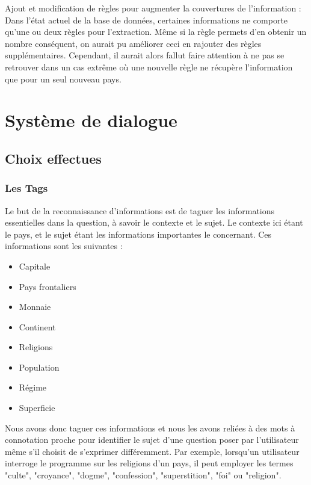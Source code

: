 \documentclass[11pt,a4paper]{article}
\begin{document}
	
Ajout et modification de règles pour augmenter la couvertures de l'information :
Dans l'état actuel de la base de données, certaines informations ne comporte qu'une ou deux règles pour l'extraction.
Même si la règle permets d'en obtenir un nombre conséquent, on aurait pu améliorer ceci en rajouter des règles supplémentaires.
Cependant, il aurait alors fallut faire attention à ne pas se retrouver dans un cas extrême où une nouvelle règle ne récupère l'information que pour un seul nouveau pays.

\clearpage

\section{Système de dialogue}

\subsection{Choix effectues}

\subsubsection{Les Tags} 

Le but de la reconnaissance d’informations est de taguer les informations essentielles dans la question, à savoir le contexte et le sujet. Le contexte ici étant le pays, et le sujet étant les informations importantes le concernant. Ces informations sont les suivantes :
\begin{itemize}
	\item Capitale
	\item Pays frontaliers
	\item Monnaie
	\item Continent
	\item Religions
	\item Population
	\item Régime
	\item Superficie
\end{itemize}

Nous avons donc taguer ces informations et nous les avons reliées à des mots à connotation proche pour identifier le sujet d'une question poser par l'utilisateur même s'il choisit de s'exprimer différemment. Par exemple, lorsqu'un utilisateur interroge le programme sur les religions d'un pays, il peut employer les termes "culte", "croyance", "dogme", "confession", "superstition", "foi" ou "religion".
\end{document}
